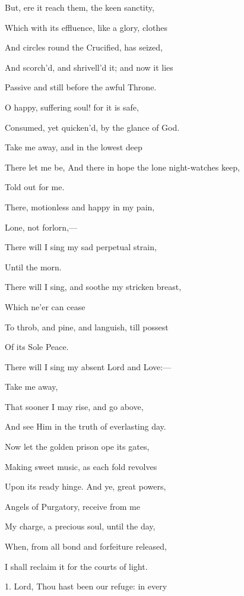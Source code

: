 But, ere it reach them, the keen sanctity,

Which with its effluence, like a glory, clothes

And circles round the Crucified, has seized,

And scorch'd, and shrivell'd it; and now it lies

Passive and still before the awful Throne.

O happy, suffering soul! for it is safe,

Consumed, yet quicken'd, by the glance of God.


Take me away, and in the lowest deep

There let me be, And there in hope the lone night-watches keep,

Told out for me.

There, motionless and happy in my pain,

Lone, not forlorn,—

There will I sing my sad perpetual strain,

Until the morn.

There will I sing, and soothe my stricken breast,

Which ne'er can cease

To throb, and pine, and languish, till possest

Of its Sole Peace.

There will I sing my absent Lord and Love:—

Take me away,

That sooner I may rise, and go above,

And see Him in the truth of everlasting day.


Now let the golden prison ope its gates,

Making sweet music, as each fold revolves

Upon its ready hinge. And ye, great powers,

Angels of Purgatory, receive from me

My charge, a precious soul, until the day,

When, from all bond and forfeiture released,

I shall reclaim it for the courts of light.


1. Lord, Thou hast been our refuge: in every

